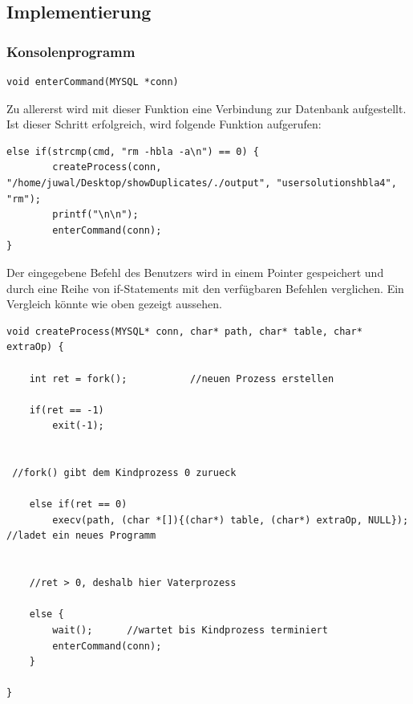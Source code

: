 \documentclass[12pt]{report}
\begin{document}
\subsection{Implementierung}

\subsubsection{Konsolenprogramm}

\begin{lstlisting}
void enterCommand(MYSQL *conn)
\end{lstlisting}

\noindent Zu allererst wird mit dieser Funktion eine Verbindung zur Datenbank aufgestellt. Ist dieser Schritt erfolgreich, wird folgende Funktion aufgerufen:\\



\begin{lstlisting}
else if(strcmp(cmd, "rm -hbla -a\n") == 0) {
        createProcess(conn, "/home/juwal/Desktop/showDuplicates/./output", "usersolutionshbla4", "rm");
        printf("\n\n");
        enterCommand(conn);
}
\end{lstlisting}

\noindent Der eingegebene Befehl des Benutzers wird in einem Pointer gespeichert und durch eine Reihe von if-Statements mit den verfügbaren Befehlen verglichen. Ein Vergleich könnte wie oben gezeigt aussehen.\\



\begin{lstlisting}
void createProcess(MYSQL* conn, char* path, char* table, char* extraOp) {

    int ret = fork();           //neuen Prozess erstellen

    if(ret == -1)
        exit(-1);
    

 //fork() gibt dem Kindprozess 0 zurueck

    else if(ret == 0)
        execv(path, (char *[]){(char*) table, (char*) extraOp, NULL});       //ladet ein neues Programm


    //ret > 0, deshalb hier Vaterprozess

    else {
        wait();      //wartet bis Kindprozess terminiert
        enterCommand(conn);
    }

}
\end{lstlisting}
\end{document}
